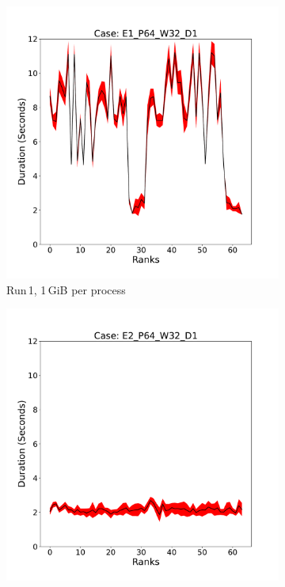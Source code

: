 \begin{figure}
     \centering
     \begin{subfigure}[b]{0.3\textwidth}
         \centering
         \includegraphics[width=\textwidth, height=\textwidth]{figures/deisa2__E1_P64_W32_D1.pdf}
         \caption{Run\,1, 1\,GiB per process}
         \label{fig:E1_1_d22}
     \end{subfigure}
     \hfill
     \begin{subfigure}[b]{0.3\textwidth}
         \centering
         \includegraphics[width=\textwidth, height=\textwidth]{figures/deisa2__E2_P64_W32_D1.pdf}

\end{subfigure}
\end{figure}
